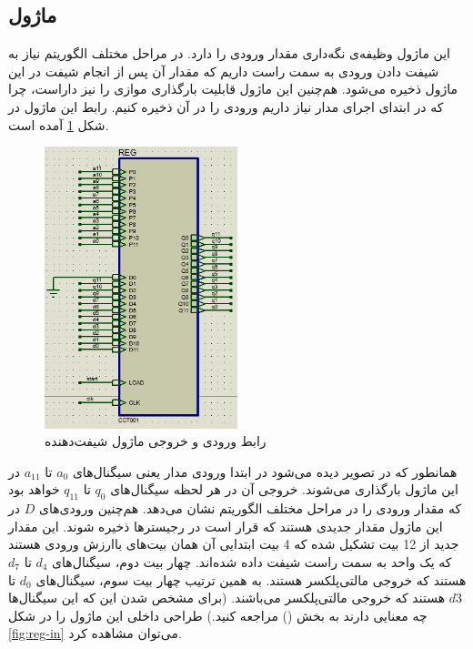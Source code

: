 \documentclass[12pt,onecolumn,a4paper,fleqn]{article}
\begin{document}
	\subsection{ماژول }
	این ماژول وظیفه‌ی نگه‌داری مقدار ورودی را دارد. در مراحل مختلف الگوریتم نیاز به شیفت دادن ورودی به سمت راست داریم که مقدار آن پس از انجام شیفت در این ماژول ذخیره می‌شود. هم‌چنین این ماژول قابلیت بارگذاری موازی را نیز داراست، چرا که در ابتدای اجرای مدار نیاز داریم ورودی را در آن ذخیره کنیم. رابط این ماژول در شکل \ref{fig:reg} آمده است.
	\begin{figure}[H]
		\centering
		\includegraphics[width=0.5\textwidth]{source/reg.png}
		\caption{رابط ورودی و خروجی ماژول شیفت‌دهنده}
		\label{fig:reg}
	\end{figure}
	همانطور که در تصویر دیده می‌شود در ابتدا ورودی مدار یعنی سیگنال‌های $a_0$ تا $a_{11}$ در این ماژول بارگذاری می‌شوند. خروجی آن در هر لحظه سیگنال‌های $q_0$ تا $q_{11}$ خواهد بود که مقدار ورودی را در مراحل مختلف الگوریتم نشان می‌دهد. هم‌چنین ورودی‌های $D$ در این ماژول مقدار جدیدی هستند که قرار است در رجیسترها ذخیره شوند. این مقدار جدید از 12 بیت تشکیل شده که 4 بیت ابتدایی آن همان بیت‌های باارزش ورودی هستند که یک واحد به سمت راست شیفت داده شده‌اند. چهار بیت دوم، سیگنال‌های $d_4$ تا $d_7$ هستند که خروجی مالتی‌پلکسر  هستند. به همین ترتیب چهار بیت سوم، سیگنال‌های $d_0$ تا $d3$ هستند که خروجی مالتی‌پلکسر  می‌باشند. (برای مشخص شدن این که این سیگنال‌ها چه معنایی دارند به بخش () مراجعه کنید.) طراحی داخلی این ماژول را در شکل \ref{fig:reg-in} می‌توان مشاهده کرد.
\end{document}
